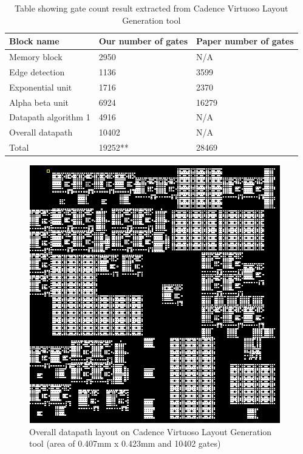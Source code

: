 \documentclass[letterpaper, 11pt]{article}
\begin{document}
	
	
	\begin{table}
		\label{table2}
		\caption{Table showing gate count result extracted from Cadence Virtuoso Layout Generation tool}
		\centering
		\begin{tabular}{lll}
			Block name & Our number of gates & Paper \cite{1} number of gates \\ 
			\hline
			Memory block & 2950 & N/A \\
			Edge detection & 1136 & 3599 \\
			Exponential unit & 1716 & 2370 \\
			Alpha beta unit & 6924 & 16279  \\
			Datapath algorithm 1 & 4916 & N/A\\
			Overall datapath & 10402 & N/A \\
			\hline
			Total & 19252** & 28469 \\                 
			\hline
		\end{tabular}
	\end{table}
	
	\newpage
	\begin{figure}[htb!]
		\centering
		\includegraphics[width=0.85\linewidth]{report_pics/datapath_layout.png}
		\caption{Overall datapath layout on Cadence Virtuoso Layout Generation tool (area of 0.407mm x 0.423mm and 10402 gates)}
		\label{fig45}
	\end{figure}
	
\end{document}
